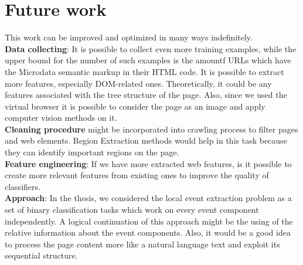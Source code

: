 \section{Future work}

This work can be improved and optimized in many ways indefinitely. \\

\noindent\textbf{Data collecting}: It is possible to collect even more training examples, while the upper bound for the number of such examples is the amountf URLs which have the Microdata semantic markup in their HTML code. It is possible to extract more features, especially DOM-related ones. Theoretically, it could be any features associated with the tree structure of the page. Also, since we used the virtual browser it is possible to consider the page as an image and apply computer vision methods on it. \\

\noindent\textbf{Cleaning procedure} might be incorporated into crawling process to filter pages and web elements. Region Extraction methods would help in this task because they can identify important regions on the page. \\

\noindent\textbf{Feature engineering}: If we have more extracted web features, is it possible to create more relevant features from existing ones to improve the quality of classifiers. \\

\noindent\textbf{Approach}: In the thesis, we considered the local event extraction problem as a set of binary classification tasks which work on every event component independently. A logical continuation of this approach might be the using of the relative information about the event components. Also, it would be a good idea to process the page content more like a natural language text and exploit its sequential structure.